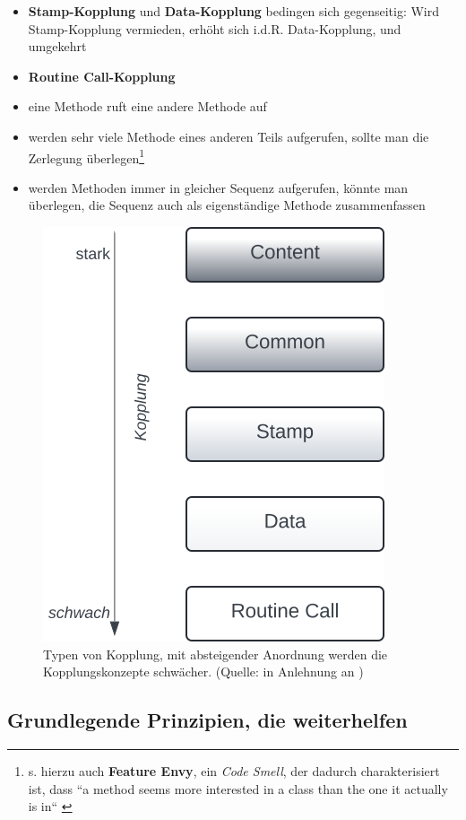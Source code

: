 \begin{itemize}
{    }
    \item[] \textbf{Stamp-Kopplung} und \textbf{Data-Kopplung} bedingen sich gegenseitig: Wird Stamp-Kopplung vermieden, erhöht sich i.d.R. Data-Kopplung, und umgekehrt
    \item \textbf{Routine Call-Kopplung}
    \item[] eine Methode ruft eine andere Methode auf
    \item[] werden sehr viele Methode eines anderen Teils aufgerufen, sollte man die Zerlegung überlegen\footnote{
    s. hierzu auch \textbf{Feature Envy}, ein \textit{Code Smell}, der dadurch charakterisiert ist, dass ``a method seems more interested in a class than the one it actually is in`` \cite[80 f.]{Fow99}
    }
    \item[] werden Methoden immer in gleicher Sequenz aufgerufen, könnte man überlegen, die Sequenz auch als eigenständige Methode zusammenfassen
\end{itemize}

\begin{figure}
    \centering
    \includegraphics[scale=0.4]{part two/Objektorientierter Entwurf/img/kopplung}
    \caption{Typen von Kopplung, mit absteigender Anordnung werden die Kopplungskonzepte schwächer.  (Quelle: in Anlehnung an \cite[73, Abb. 3.18]{Wed09b})}
    \label{fig:kopplung}
\end{figure}

\subsection{Grundlegende Prinzipien, die weiterhelfen}


